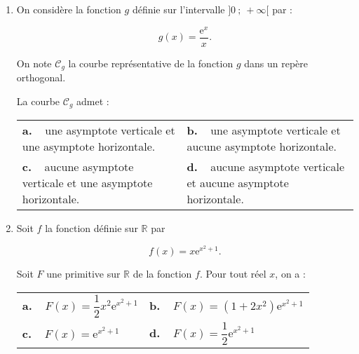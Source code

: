 \documentclass[11pt]{article}
\newcommand{\R}{\mathbb{R}}
\newcommand{\e}{\text{e}}
\begin{document}
\begin{enumerate}[resume]
\item On considère la fonction $g$ définie sur l'intervalle $]0~;~+\infty[$ par : 

\[g(x) = \dfrac{\e^x}{x}.\]

On note $\mathcal{C}_g$ la courbe représentative de la fonction $g$ dans un repère orthogonal.

La courbe $\mathcal{C}_g$ admet :

\begin{center}
\begin{tabularx}{\linewidth}{X X}
\textbf{a.~~}une asymptote verticale
et une asymptote horizontale.&\textbf{b.~~}une asymptote verticale
et aucune asymptote horizontale.\\
\textbf{c.~~}aucune asymptote verticale et une asymptote horizontale.&\textbf{d.~~}aucune asymptote verticale et aucune asymptote horizontale.
\end{tabularx}
\end{center}
\item Soit $f$ la fonction définie sur $\R$ par

\[f(x) = x\e^{x^2+1}.\]

Soit $F$ une primitive sur $\R$ de la fonction $f$. Pour tout réel $x$, on a :

\begin{center}
\begin{tabularx}{\linewidth}{X X}
\textbf{a.~~}$F(x) = \dfrac12x^2\e^{x^2+1}$ 	& \textbf{b.~~}$F(x) = \left(1 + 2x^2 \right)\e^{x^2+1}$ \\
\textbf{c.~~}$F(x) = \e^{x^2+1}$				& \textbf{d.~~}$F(x) = \dfrac12\e^{x^2+1}$
\end{tabularx}
\end{center}
\end{enumerate}
\end{document}

